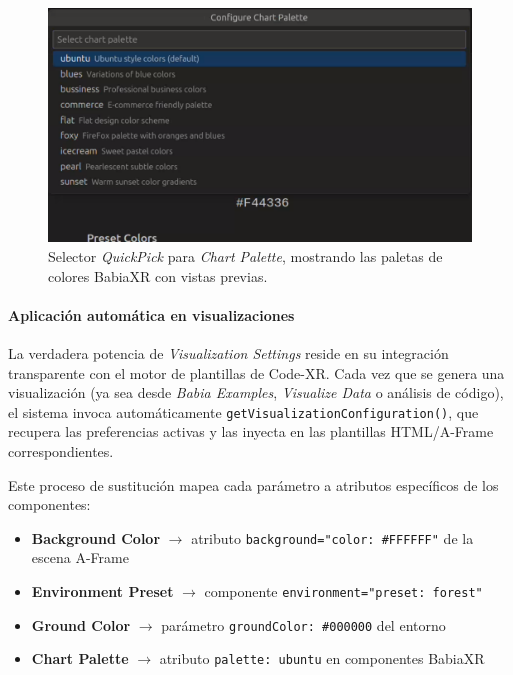 \documentclass[a4paper, 12pt]{book}
\begin{document}
\begin{figure}[H]
\centering
\includegraphics[width=0.70\linewidth]{img/ui-chart-palette-quickpick.png}
\caption{Selector \emph{QuickPick} para \emph{Chart Palette}, mostrando las paletas de colores BabiaXR con vistas previas.}
\label{fig:ui-chart-palette-quickpick}
\end{figure}

\paragraph{Aplicación automática en visualizaciones}
La verdadera potencia de \emph{Visualization Settings} reside en su integración transparente con el motor de plantillas de Code-XR. Cada vez que se genera una visualización (ya sea desde \emph{Babia Examples}, \emph{Visualize Data} o análisis de código), el sistema invoca automáticamente \texttt{getVisualizationConfiguration()}, que recupera las preferencias activas y las inyecta en las plantillas HTML/A-Frame correspondientes.

Este proceso de sustitución mapea cada parámetro a atributos específicos de los componentes:
\begin{itemize}
\item \textbf{Background Color} $\rightarrow$ atributo \texttt{background="color: \#FFFFFF"} de la escena A-Frame
\item \textbf{Environment Preset} $\rightarrow$ componente \texttt{environment="preset: forest"} 
\item \textbf{Ground Color} $\rightarrow$ parámetro \texttt{groundColor: \#000000} del entorno
\item \textbf{Chart Palette} $\rightarrow$ atributo \texttt{palette: ubuntu} en componentes BabiaXR
\end{itemize}
\end{document}
